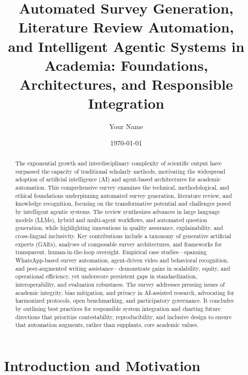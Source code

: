 \documentclass[11pt]{article}
\begin{document}
\author{Your Name}
\date{\today}

\title{\title{Automated Survey Generation, Literature Review Automation, and Intelligent Agentic Systems in Academia: Foundations, Architectures, and Responsible Integration}}
\maketitle

\begin{abstract}

The exponential growth and interdisciplinary complexity of scientific output have surpassed the capacity of traditional scholarly methods, motivating the widespread adoption of artificial intelligence (AI) and agent-based architectures for academic automation. This comprehensive survey examines the technical, methodological, and ethical foundations underpinning automated survey generation, literature review, and knowledge recognition, focusing on the transformative potential and challenges posed by intelligent agentic systems. The review synthesizes advances in large language models (LLMs), hybrid and multi-agent workflows, and automated question generation, while highlighting innovations in quality assurance, explainability, and cross-lingual inclusivity. Key contributions include a taxonomy of generative artificial experts (GAEs), analyses of composable survey architectures, and frameworks for transparent, human-in-the-loop oversight. Empirical case studies—spanning WhatsApp-based survey automation, agent-driven video and behavioral recognition, and peer-augmented writing assistance—demonstrate gains in scalability, equity, and operational efficiency, yet underscore persistent gaps in standardization, interoperability, and evaluation robustness. The survey addresses pressing issues of academic integrity, bias mitigation, and privacy in AI-assisted research, advocating for harmonized protocols, open benchmarking, and participatory governance. It concludes by outlining best practices for responsible system integration and charting future directions that prioritize contestability, reproducibility, and inclusive design to ensure that automation augments, rather than supplants, core academic values.


\end{abstract}\section{Introduction and Motivation}
\end{document}
